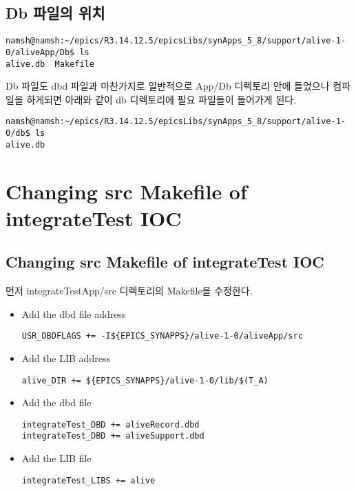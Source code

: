 \documentclass[11pt
  , a4paper
  , article
  , oneside
]{memoir}
\begin{document}
\subsection{Db 파일의 위치}
\begin{lstlisting}[style=termstyle]
namsh@namsh:~/epics/R3.14.12.5/epicsLibs/synApps_5_8/support/alive-1-0/aliveApp/Db$ ls
alive.db  Makefile
\end{lstlisting}
Db 파일도 dbd 파일과 마찬가지로 일반적으로 App/Db 디렉토리 안에 들었으나 컴파일을 하게되면 아래와 같이 db 디렉토리에 필요 파일들이 들어가게 된다.
\begin{lstlisting}[style=termstyle]
namsh@namsh:~/epics/R3.14.12.5/epicsLibs/synApps_5_8/support/alive-1-0/db$ ls
alive.db
\end{lstlisting}
\section{Changing src Makefile of integrateTest IOC}
\subsection{Changing src Makefile of integrateTest IOC}
먼저 integrateTestApp/src 디렉토리의 Makefile을 수정한다.
\begin{itemize}
	
\item Add the dbd file address
\begin{lstlisting}[style=termstyle]
USR_DBDFLAGS += -I${EPICS_SYNAPPS}/alive-1-0/aliveApp/src
\end{lstlisting}
\item Add the LIB address
\begin{lstlisting}[style=termstyle]
alive_DIR += ${EPICS_SYNAPPS}/alive-1-0/lib/$(T_A)
\end{lstlisting}
\item Add the dbd file
\begin{lstlisting}[style=termstyle]
integrateTest_DBD += aliveRecord.dbd   
integrateTest_DBD += aliveSupport.dbd
\end{lstlisting}
\item Add the LIB file
\begin{lstlisting}[style=termstyle]
integrateTest_LIBS += alive
\end{lstlisting}
\end{itemize}
\end{document}
